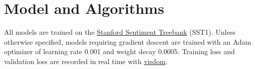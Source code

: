 \documentclass[11pt]{article}
\begin{document}
%
%
%
%
%
%

\section{Model and Algorithms}

All models are trained on the \href{https://nlp.stanford.edu/~socherr/EMNLP2013_RNTN.pdf}{Stanford Sentiment Treebank} (SST1). Unless otherwise specified, models requiring gradient descent are trained with an Adam optimizer of learning rate 0.001 and weight decay 0.0005.  Training loss and validation loss are recorded in real time with \href{https://github.com/facebookresearch/visdom}{visdom}.
\end{document}
